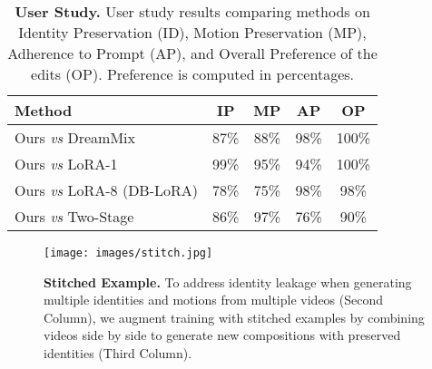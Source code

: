 \begin{table}[h]
\centering
\caption{\textbf{User Study.} User study results comparing methods on Identity Preservation (ID), Motion Preservation (MP), Adherence to Prompt (AP), and Overall Preference of the edits (OP). Preference is computed in percentages.}
\label{tab:user_study_results}
\begin{tabular}{lcccc}
\toprule
\textbf{Method} & \textbf{IP} & \textbf{MP} & \textbf{AP} & \textbf{OP} \\
\midrule
Ours \textit{vs} DreamMix     & 87\% & 88\% & 98\% & 100\% \\
Ours \textit{vs} LoRA-1      & 99\% & 95\% & 94\% & 100\% \\
Ours \textit{vs} LoRA-8 (DB-LoRA)     & 78\% & 75\% & 98\% & 98\% \\
Ours \textit{vs} Two-Stage    & 86\% & 97\% & 76\% & 90\% \\
\bottomrule
\end{tabular}
\end{table}


\begin{figure}[t!]
        \centering
        \texttt{[image: images/stitch.jpg]}
        \caption{\textbf{Stitched Example.} To address identity leakage when generating multiple identities and motions from multiple videos (Second Column), we augment training with stitched examples by combining videos side by side to generate new compositions with preserved identities (Third Column).}
        \label{fig:stitch}
    \end{figure}

